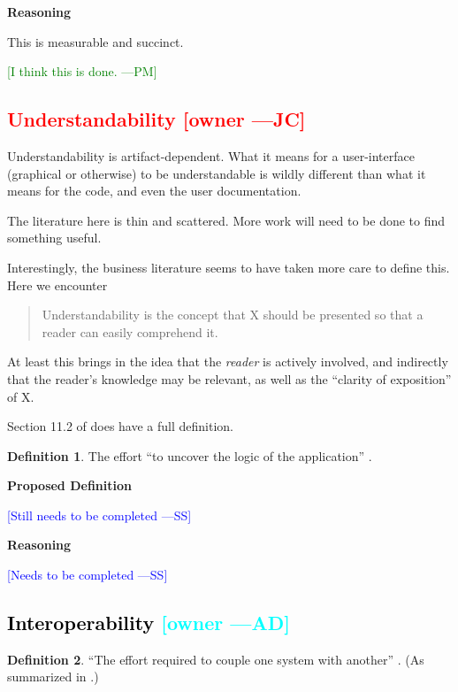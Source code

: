 \documentclass[letterpaper,cleveref]{lipics-v2019}
\newcommand{\authornote}[3]{\textcolor{#1}{[#3 ---#2]}}
\newcommand{\authornote}[3]{}
\newcommand{\wss}[1]{\authornote{blue}{SS}{#1}} %
\newcommand{\jc}[1]{\authornote{red}{JC}{#1}} %
\newcommand{\pmi}[1]{\authornote{green}{PM}{#1}} %
\newcommand{\ad}[1]{\authornote{cyan}{AD}{#1}} %
\newcommand{\notdone}[1]{\textcolor{red}{#1}}
\newcommand{\done}[1]{\textcolor{black}{#1}}
\theoremstyle{definition}
\newtheorem{defn}{Definition}
\begin{document}
\noindent \textbf{Reasoning}

This is measurable and succinct. 

\pmi{I think this is done.}

\subsection{\notdone{Understandability} \jc{owner}}

Understandability is artifact-dependent. What it means for a user-interface
(graphical
or otherwise) to be understandable is wildly different than what it means for
the code,
and even the user documentation.

The literature here is thin and scattered.  More work will need to be done to
find
something useful.

Interestingly, the business literature seems to have taken more care to define
this.
Here we encounter
\begin{quote}
	Understandability is the concept that X should be presented
	so that a reader can easily comprehend it.
\end{quote}
At least this brings in the idea that the \emph{reader} is actively involved,
and
indirectly that the reader's knowledge may be relevant, as well as the
``clarity of exposition'' of X.

Section 11.2 of \citet{adams2015nonfunctional} does have a full definition.

\begin{defn}
	The effort ``to uncover the logic of the application''
	\citep{ghezzi1991fundamentals}.
\end{defn}

\noindent \textbf{Proposed Definition}

\wss{Still needs to be completed}

\noindent \textbf{Reasoning}

\wss{Needs to be completed}

\subsection{\done{Interoperability} \ad{owner}}

\begin{defn}
	``The effort required to couple one system with another''
	\citep{McCallEtAl1977}. (As summarized in \citet{VanVliet2000}.)
\end{defn}
\end{document}
